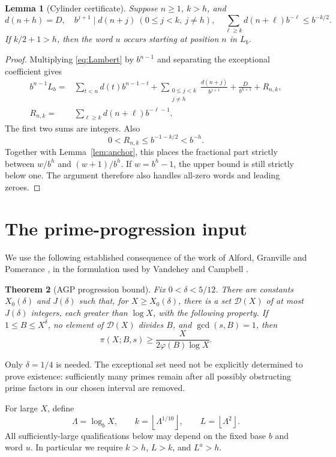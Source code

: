 \documentclass[11pt,a4paper]{article}
\newtheorem{theorem}{Theorem}[section]
\newtheorem{lemma}[theorem]{Lemma}
\theoremstyle{definition}\newtheorem{definition}[theorem]{Definition}
\theoremstyle{remark}\newtheorem{remark}[theorem]{Remark}
\newcommand{\floor}[1]{\left\lfloor #1\right\rfloor}\newcommand{\ceil}[1]{\left\lceil #1\right\rceil}
\begin{document}
\begin{lemma}[Cylinder certificate]\label{lem:cylinder}
Suppose $n\ge1$, $k>h$, and
\[
 d(n+h)=D,\quad b^{j+1}\mid d(n+j)\ (0\le j<k,\ j\ne h),
 \quad \sum_{\ell\ge k}d(n+\ell)b^{-\ell}\le b^{-k/2}.
\]
If $k/2+1>h$, then the word $u$ occurs starting at position $n$ in $L_b$.
\end{lemma}
\begin{proof}
Multiplying \eqref{eq:Lambert} by $b^{n-1}$ and separating the exceptional coefficient gives
\begin{align*}
 b^{n-1}L_b={}&\sum_{t<n}d(t)b^{n-1-t}
 +\sum_{\substack{0\le j<k\\j\ne h}}\frac{d(n+j)}{b^{j+1}}
 +\frac{D}{b^{h+1}}+R_{n,k},\\
 R_{n,k}={}&\sum_{\ell\ge k}d(n+\ell)b^{-\ell-1}.
\end{align*}
The first two sums are integers. Also
\[
 0<R_{n,k}\le b^{-1-k/2}<b^{-h}.
\]
Together with Lemma~\ref{lem:anchor}, this places the fractional part strictly between $w/b^h$ and $(w+1)/b^h$. If $w=b^h-1$, the upper bound is still strictly below one. The argument therefore also handles all-zero words and leading zeroes.
\end{proof}

\section{The prime-progression input}
We use the following established consequence of the work of Alford, Granville and Pomerance \cite{AGP}, in the formulation used by Vandehey \cite{Vandehey} and Campbell \cite[Lemma~1]{Campbell}.

\begin{theorem}[AGP progression bound]\label{thm:AGP}
Fix $0<\delta<5/12$. There are constants $X_0(\delta)$ and $J(\delta)$ such that, for $X\ge X_0(\delta)$, there is a set $\mathcal D(X)$ of at most $J(\delta)$ integers, each greater than $\log X$, with the following property. If $1\le B\le X^\delta$, no element of $\mathcal D(X)$ divides $B$, and $\gcd(s,B)=1$, then
\[
 \pi(X;B,s)\ge\frac{X}{2\varphi(B)\log X}.
\]
\end{theorem}

Only $\delta=1/4$ is needed. The exceptional set need not be explicitly determined to prove existence: sufficiently many primes remain after all possibly obstructing prime factors in our chosen interval are removed.

For large $X$, define
\begin{equation}\label{eq:parameters}
 \Lambda=\log_b X,\qquad k=\floor{\Lambda^{1/10}},
 \qquad L=\floor{\Lambda^2}.
\end{equation}
All sufficiently-large qualifications below may depend on the fixed base $b$ and word $u$. In particular we require $k>h$, $L>k$, and $L^a>h$.
\end{document}
